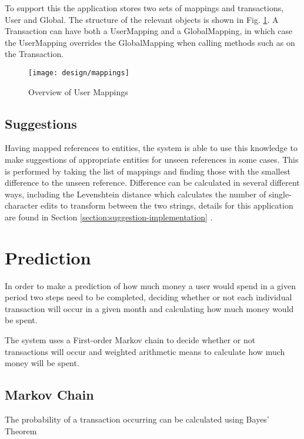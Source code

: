To support this the application stores two sets of mappings and transactions, User and Global. The structure of the relevant objects is shown in Fig. \ref{fig:transactormappings}. A Transaction can have both a UserMapping and a GlobalMapping, in which case the UserMapping overrides the GlobalMapping when calling methods such as  on the Transaction.

\begin{figure}[h]
    \centering
    \texttt{[image: design/mappings]}
    \caption{Overview of User Mappings}
    \label{fig:transactormappings}
    
    \begin{comment}
[Transaction]<>*-0..1[UserMapping]
[Transaction]<>*-0..1-[GlobalMapping]
[User]<>-*[UserMapping]
[UserMapping]<>*-[UserTransactor]
[UserTransactor]<>*-[Category]
[GlobalTransactor]<>*-[Category]
[GlobalMapping]<>*-[GlobalTransactor]
    \end{comment}
\end{figure}

\subsection{Suggestions}
Having mapped references to entities, the system is able to use this knowledge to make suggestions of appropriate entities for unseen references in some cases. This is performed by taking the list of mappings and finding those with the smallest difference to the unseen reference. Difference can be calculated in several different ways, including the Levenshtein distance which calculates the number of single-character edits to transform between the two strings, details for this application are found in Section \ref{section:suggestion-implementation} \cite{levenshtein1966binary}.

\section{Prediction}
In order to make a prediction of how much money a user would spend in a given period two steps need to be completed, deciding whether or not each individual transaction will occur in a given month and calculating how much money would be spent.

The system uses a First-order Markov chain to decide whether or not transactions will occur and weighted arithmetic means to calculate how much money will be spent.

\subsection{Markov Chain}
The probability of a transaction occurring can be calculated using Bayes' Theorem

